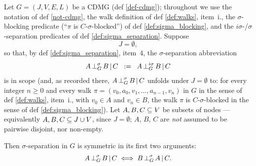 \documentclass[main]{subfiles}
\begin{document}
\def\rowref{claim\_3\_22}
\label{claim_3_22}

\providecommand{\HeadAtTarget}{\mathrm{HeadAtTarget}}
\providecommand{\HeadAtSource}{\mathrm{HeadAtSource}}
\providecommand{\IsCollider}{\mathrm{IsCollider}}
\providecommand{\IsNonCollider}{\mathrm{IsNonCollider}}
\providecommand{\HasBlockingLeftSlot}{\mathrm{HasBlockingLeftSlot}}
\providecommand{\HasBlockingRightSlot}{\mathrm{HasBlockingRightSlot}}
\providecommand{\WalkStep}{\texttt{WalkStep}}
\providecommand{\Node}{\texttt{Node}}
\providecommand{\IsDiag}{\mathrm{IsDiag}}
\providecommand{\Sym}{\mathrm{Sym}}

\begin{Lem}\label{lem:sigma_separation_symmetric}
    Let $G = (J, V, E, L)$ be a CDMG (def \ref{def-cdmg}); throughout we use the notation of def \ref{not-cdmg}, the walk definition of def \ref{def:walks}, item~i., the $\sigma$-blocking predicate (``$\pi$ is $C$-$\sigma$-blocked'') of def \ref{def:sigma_blocking}, and the $i\sigma$-/$\sigma$-separation predicates of def \ref{def:sigma_separation}. Suppose
    \[
        J = \emptyset,
    \]
    so that, by def \ref{def:sigma_separation}, item~4, the $\sigma$-separation abbreviation
    \[
        A \operatorname{\perp}^{\sigma}_G B \operatorname{|} C \;\; := \;\; A \operatorname{\perp}^{i\sigma}_G B \operatorname{|} C
    \]
    is in scope (and, as recorded there, $A \operatorname{\perp}^{\sigma}_G B \operatorname{|} C$ unfolds under $J = \emptyset$ to: for every integer $n \ge 0$ and every walk $\pi = (v_0, a_0, v_1, \dots, a_{n-1}, v_n)$ in $G$ in the sense of def \ref{def:walks}, item~i., with $v_0 \in A$ and $v_n \in B$, the walk $\pi$ is $C$-$\sigma$-blocked in the sense of def \ref{def:sigma_blocking}).
    Let $A, B, C \subseteq V$ be subsets of nodes --- equivalently $A, B, C \subseteq J \cup V$, since $J = \emptyset$; $A$, $B$, $C$ are \emph{not} assumed to be pairwise disjoint, nor non-empty.

    Then $\sigma$-separation in $G$ is symmetric in its first two arguments:
    \[
        A \operatorname{\perp}^{\sigma}_G B \operatorname{|} C \iff B \operatorname{\perp}^{\sigma}_G A \operatorname{|} C.
    \]
\end{Lem}
\end{document}
